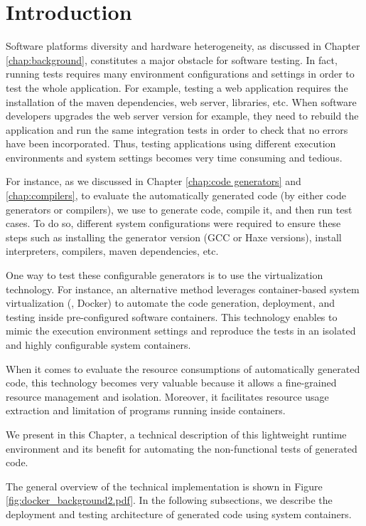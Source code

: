 \section{Introduction}

Software platforms diversity and hardware heterogeneity, as discussed in Chapter \ref{chap:background}, constitutes a major obstacle for software testing. In fact, running tests requires many environment configurations and settings in order to test the whole application. For example, testing a web application requires the installation of the maven dependencies, web server, libraries, etc. When software developers upgrades the web server version for example, they need to rebuild the application and run the same integration tests in order to check that no errors  have been incorporated. Thus, testing applications using different execution environments and system settings becomes very time consuming and tedious.

For instance, as we discussed in Chapter \ref{chap:code generators} and \ref{chap:compilers}, to evaluate the automatically generated code (by either code generators or compilers), we use to generate code, compile it, and then run test cases. To do so, different system configurations were required to ensure these steps such as installing the generator version (GCC or Haxe versions), install interpreters, compilers, maven dependencies, etc. 

One way to test these configurable generators is to use the virtualization technology. For instance, an alternative method leverages container-based system virtualization (\eg, Docker) to automate the code generation, deployment, and testing inside pre-configured software containers.
This technology enables to mimic the execution environment settings and reproduce the tests in an isolated and highly configurable system containers.

When it comes to evaluate the resource consumptions of automatically generated code, this technology becomes very valuable because it allows a fine-grained resource management and isolation. Moreover, it facilitates resource usage extraction and limitation of programs running inside containers. 

We present in this Chapter, a technical description of this lightweight runtime environment and its benefit for automating the non-functional tests of generated code. 

\iffalse



The general overview of the technical implementation is shown in Figure \ref{fig:docker_background2.pdf}. In the following subsections, we describe the deployment and testing architecture of generated code using system containers.
 

